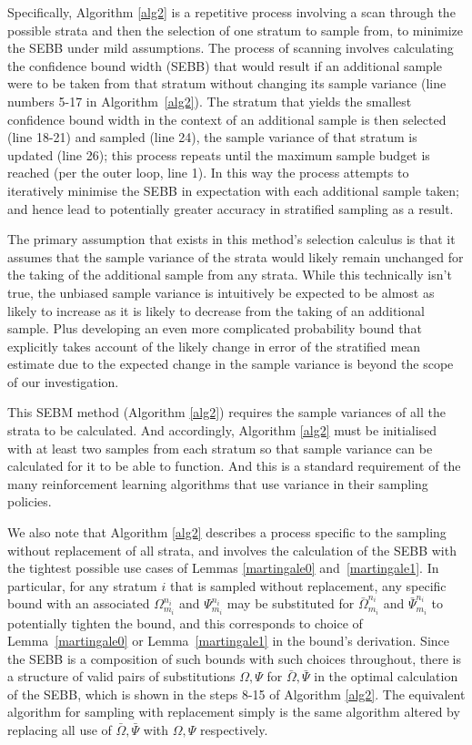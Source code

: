 Specifically, Algorithm \ref{alg2} is a repetitive process involving a scan through the possible strata and then the selection of one stratum to sample from, to minimize the SEBB under mild assumptions.
The process of scanning involves calculating the confidence bound width (SEBB) that would result if an additional sample were to be taken from that stratum without changing its sample variance (line numbers 5-17 in Algorithm~\ref{alg2}).
The stratum that yields the smallest confidence bound width in the context of an additional sample is then selected (line 18-21) and sampled (line 24), the sample variance of that stratum is updated (line 26); 
this process repeats until the maximum sample budget is reached (per the outer loop, line 1).
In this way the process attempts to iteratively minimise the SEBB in expectation with each additional sample taken; and hence lead to potentially greater accuracy in stratified sampling as a result.

The primary assumption that exists in this method's selection calculus is that it assumes that the sample variance of the strata would likely remain unchanged for the taking of the additional sample from any strata.
While this technically isn't true, the unbiased sample variance is intuitively be expected to be almost as likely to increase as it is likely to decrease from the taking of an additional sample.
Plus developing an even more complicated probability bound that explicitly takes account of the likely change in error of the stratified mean estimate due to the expected change in the sample variance is beyond the scope of our investigation.

This SEBM method (Algorithm \ref{alg2}) requires the sample variances of all the strata to be calculated. And accordingly, Algorithm \ref{alg2} must be initialised with at least two samples from each stratum so that sample variance can be calculated for it to be able to function.
And this is a standard requirement of the many reinforcement learning algorithms that use variance in their sampling policies.

We also note that Algorithm \ref{alg2} describes a process specific to the sampling without replacement of all strata, and involves the calculation of the SEBB with the tightest possible use cases of Lemmas \ref{martingale0} and~\ref{martingale1}.
In particular, for any stratum $i$ that is sampled without replacement, any specific bound with an associated $\Omega_{m_i}^{n_i}$ and $\Psi_{m_i}^{n_i}$ may be substituted for $\bar{\Omega}_{m_i}^{n_i}$ and $\bar{\Psi}_{m_i}^{n_i}$ to potentially tighten the bound, and this corresponds to choice of Lemma~\ref{martingale0} or Lemma~\ref{martingale1} in the bound's derivation. 
Since the SEBB is a composition of such bounds with such choices throughout, there is a structure of valid pairs of substitutions $\Omega,\Psi$ for $\bar{\Omega},\bar{\Psi}$ in the optimal calculation of the SEBB, which is shown in the steps 8-15 of Algorithm \ref{alg2}.
The equivalent algorithm for sampling with replacement simply is the same algorithm altered by replacing all use of $\bar{\Omega},\bar{\Psi}$ with $\Omega,\Psi$ respectively.

